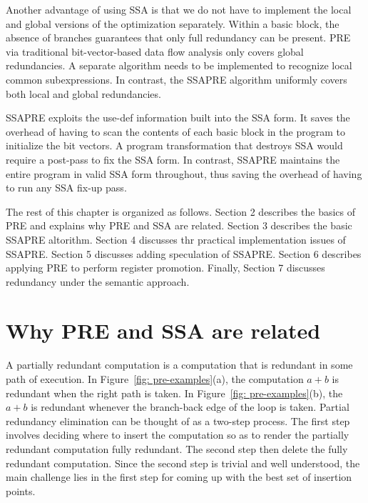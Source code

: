 Another advantage of using SSA is that we do not have to implement the local
and global versions of the optimization separately.  Within a basic block,
the absence of branches guarantees that only full redundancy can be present.
PRE via traditional bit-vector-based data flow analysis only covers global
redundancies.  A separate algorithm needs to be implemented to recognize
local common subexpressions.  In contrast, the SSAPRE algorithm uniformly
covers both local and global redundancies.

SSAPRE exploits the use-def information built into the SSA form.  It saves
the overhead of having to scan the contents of each basic block in the
program to initialize the bit vectors.  A program transformation that
destroys SSA would require a post-pass to fix the SSA form.  In contrast,
SSAPRE maintains the entire program in valid SSA form throughout,
thus saving the overhead of having to run any SSA fix-up pass.

The rest of this chapter is organized as follows.  Section 2 describes
the basics of PRE and explains why PRE and SSA are related.
Section 3 describes the basic SSAPRE altorithm.
Section 4 discusses thr practical implementation issues of SSAPRE.
Section 5 discusses adding speculation of SSAPRE.
Section 6 describes applying PRE to perform register promotion.
Finally, Section 7 discusses redundancy under the semantic approach.

\section{Why PRE and SSA are related}
\label{section:Part3:Pre_not_helped:PRErelatedtoSSA}

A partially redundant computation is a computation that is redundant in
some path of execution.  In Figure~\ref{fig: pre-examples}(a), the
computation $a+b$ is redundant when the right path is taken.
In Figure~\ref{fig: pre-examples}(b), the $a+b$ is redundant whenever
the branch-back edge of the loop is taken.
Partial redundancy elimination can be thought of as a two-step process.
The first step involves deciding where to insert the computation so as to
render the partially redundant computation fully redundant.  The second
step then delete the fully redundant computation.  Since the second step is
trivial and well understood, the main challenge lies in the first step
for coming up with the best set of insertion points.

